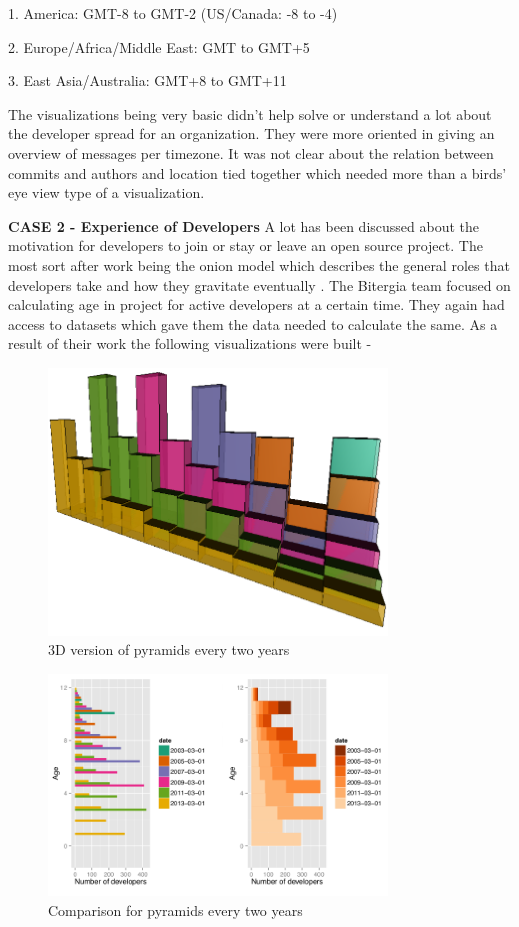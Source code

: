 \documentclass[double,12pt]{beavtex}
\begin{document}
1. America: GMT-8 to GMT-2 (US/Canada: -8 to -4)

2. Europe/Africa/Middle East: GMT to GMT+5

3. East Asia/Australia: GMT+8 to GMT+11


The visualizations being very basic didn't help solve or understand a lot about the developer spread for an organization. They were more oriented in giving an overview of messages per timezone. It was not clear about the relation between commits and authors and location tied together which needed more than a birds' eye view type of a visualization. 

\textbf{CASE 2 - Experience of Developers}
A lot has been discussed about the motivation for developers to join or stay or leave an open source project. The most sort after work being the onion model which describes the general roles that developers take and how they gravitate eventually \cite{crowston2005,  kishida2003}. The Bitergia team focused on calculating age in project for active developers at a certain time. They again had access to datasets which gave them the data needed to calculate the same. As a result of their work the following visualizations were built - 

\begin{figure}[!ht]
\centering
\includegraphics[width=90mm]{age2.png}
\caption{3D version of pyramids every two years}
\end{figure}

\begin{figure}[!ht]
\centering
\includegraphics[width=90mm]{age1.png}
\caption{Comparison for pyramids every two years}
\end{figure}
\end{document}

